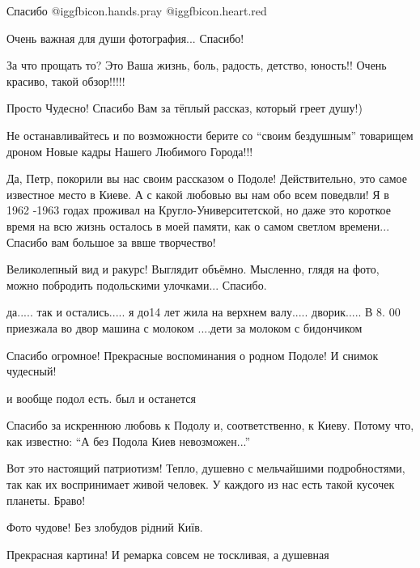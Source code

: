 \begin{itemize}
Спасибо @igg{fbicon.hands.pray} @igg{fbicon.heart.red}

Очень важная для души фотография...
Спасибо!

За что прощать то? Это Ваша жизнь, боль, радость, детство, юность!! Очень
красиво, такой обзор!!!!!



Просто Чудесно! Спасибо Вам за тёплый рассказ, который греет душу!)

Не останавливайтесь и по возможности берите со \enquote{своим бездушным} товарищем
дроном Новые кадры Нашего Любимого Города!!!


Да, Петр, покорили вы нас своим рассказом о Подоле! Действительно, это самое
известное место в Киеве. А с какой любовью вы нам обо всем поведвли! Я в 1962
-1963 годах проживал на Кругло-Университетской, но даже это короткое время на
всю жизнь осталось в моей памяти, как о самом светлом времени... Спасибо вам
большое за ввше творчество!


Великолепный вид и ракурс! Выглядит объёмно. Мысленно, глядя на фото, можно
побродить подольскими улочками... Спасибо.


да..... так и остались..... я до14 лет жила на верхнем валу..... дворик..... В 8. 00
приезжала во двор машина с молоком ....дети за молоком с бидончиком

Спасибо огромное! Прекрасные воспоминания о родном Подоле! И снимок чудесный!

и вообще подол есть. был и останется


Спасибо за искреннюю любовь к Подолу и, соответственно, к Киеву. Потому что,
как известно: \enquote{А без Подола Киев невозможен...}


Вот это настоящий патриотизм! Тепло, душевно с мельчайшими подробностями, так как
их воспринимает живой человек. У каждого из нас есть такой кусочек планеты.
Браво!


Фото чудове! Без злобудов рідний Київ.

Прекрасная картина! И ремарка совсем не тоскливая, а душевная


\end{itemize}
